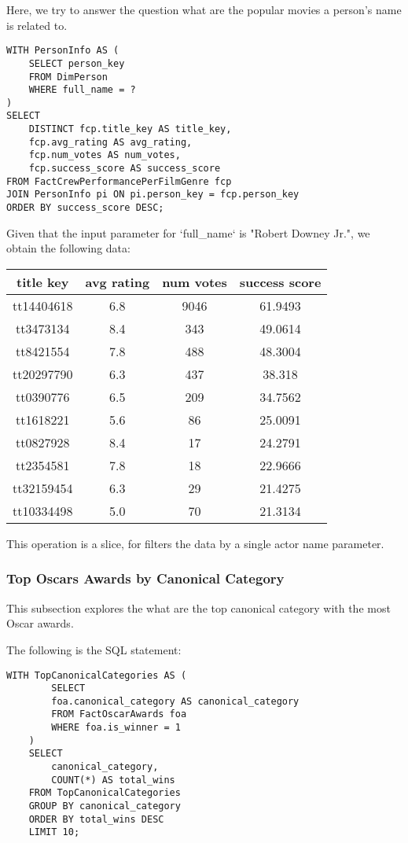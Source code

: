 Here, we try to answer the question what are the popular movies a person's name is related to.  

\begin{lstlisting}[style=SQLStyle]
WITH PersonInfo AS (
	SELECT person_key
	FROM DimPerson
	WHERE full_name = ?
)
SELECT
	DISTINCT fcp.title_key AS title_key,
	fcp.avg_rating AS avg_rating,
	fcp.num_votes AS num_votes,
	fcp.success_score AS success_score
FROM FactCrewPerformancePerFilmGenre fcp
JOIN PersonInfo pi ON pi.person_key = fcp.person_key
ORDER BY success_score DESC;
\end{lstlisting}

Given that the input parameter for `full\_name` is "Robert Downey Jr.", we obtain the following data:

\begin{center}
	\begin{tabular}{|c|c|c|c|}
		\hline
		title key & avg rating & num votes & success score \\
		\hline
		tt14404618 & 6.8 & 9046 & 61.9493 \\
		tt3473134 & 8.4 & 343 & 49.0614 \\
		tt8421554 & 7.8 & 488 & 48.3004 \\
		tt20297790 & 6.3 & 437 & 38.318 \\
		tt0390776 & 6.5 & 209 & 34.7562 \\
		tt1618221 & 5.6 & 86 & 25.0091 \\
		tt0827928 & 8.4 & 17 & 24.2791 \\
		tt2354581 & 7.8 & 18 & 22.9666 \\
		tt32159454 & 6.3 & 29 & 21.4275 \\
		tt10334498 & 5.0 & 70 & 21.3134 \\
		\hline
	\end{tabular}
\end{center}

This operation is a slice, for filters the data by a single actor name parameter.

\subsubsection{Top Oscars Awards by Canonical Category}

This subsection explores the what are the top canonical category with the most Oscar awards. 

The following is the SQL statement:
\begin{lstlisting}[style=SQLStyle]
	WITH TopCanonicalCategories AS (
		SELECT
		foa.canonical_category AS canonical_category
		FROM FactOscarAwards foa
		WHERE foa.is_winner = 1
	)
	SELECT
		canonical_category,
		COUNT(*) AS total_wins
	FROM TopCanonicalCategories
	GROUP BY canonical_category
	ORDER BY total_wins DESC
	LIMIT 10;
\end{lstlisting}

